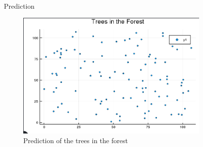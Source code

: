 \documentclass[final]{beamer}
\begin{document}
\begin{frame}
\begin{columns}[t]
\begin{column}{\colwidth}
\begin{tcolorbox}[width=\colwidth,height=\contentheight,top=.2in]
\begin{block}{Prediction}
\begin{figure}[H]
\includegraphics[width=0.9\textwidth]{predict}
\caption{Prediction of the trees in the forest}
\end{figure}

\vspace{.2in}

\end{block}







\end{tcolorbox}
\end{column}

\begin{column}{\marginwidth}\end{column} %

\end{columns}

\end{frame}
\end{document}

